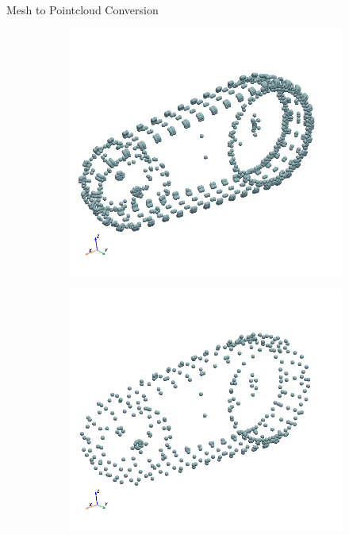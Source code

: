 \documentclass[12pt]{beamer}
\begin{document}
\begin{frame}{Mesh to Pointcloud Conversion}
\begin{figure}[H]
    \begin{subfigure}[t]{0.25\textwidth}
        \centering
        \includegraphics[width=\textwidth]{fig/flipper_surface_points.png} %
        \label{fig:fig3}
    \end{subfigure}
    \hspace{1cm}
    \begin{subfigure}[t]{0.25\textwidth}
        \centering
        \includegraphics[width=\textwidth]{fig/flipper_clustered.png} %
        \label{fig:fig4}
    \end{subfigure}

  \end{figure}
  
\end{frame}
\end{document}

